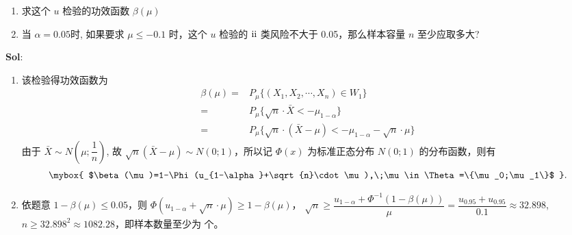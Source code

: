 \begin{enumerate}[(1)]
    \item 求这个 $u$ 检验的功效函数 $\beta(\mu)$
    \item 当 $\alpha=0.05$时, 如果要求 $\mu\leqslant-0.1$ 时，这个 $u$ 检验的 $\text{\uppercase\expandafter{\romannumeral2}}$ 类风险不大于 0.05，那么样本容量 $n$ 至少应取多大?
\end{enumerate}

\textbf{Sol}: 

\begin{enumerate}[(1)]
    \item 该检验得功效函数为
    $$
    \begin{aligned}
    \beta(\mu)=&P_{\mu}\big\{(X_1,X_2,\cdots,X_n)\in W_1\big\}\\
    =&P_{\mu}\big\{\sqrt{n}\cdot\bar{X}<-\mu_{1-\alpha}\big\}\\
    =&P_{\mu}\big\{\sqrt{n}\cdot(\bar{X}-\mu)<-\mu_{1-\alpha}-\sqrt{n}\cdot\mu\big\}
    \end{aligned}
    $$
    由于 $\bar{X}\sim N(\mu;\dfrac{1}{n})$, 故 $\sqrt{n}(\bar{X}-\mu)\sim N(0;1)$，所以记 $\Phi(x)$ 为标准正态分布 $N(0;1)$ 的分布函数，则有
    $$
    \mybox{
        $\beta(\mu)=1-\Phi(u_{1-\alpha}+\sqrt{n}\cdot \mu),\;\mu\in\Theta=\{\mu_0;\mu_1\}$
    }.
    $$
    
    \item 依题意 $1-\beta(\mu)\leqslant 0.05$，则 $\Phi(u_{1-\alpha}+\sqrt{n}\cdot \mu)\geqslant 1-\beta(\mu)$，
    $\sqrt{n}\geqslant \dfrac{u_{1-\alpha}+\Phi^{-1}(1-\beta(\mu))}{\mu}=\dfrac{u_{0.95}+u_{0.95}}{0.1}\approx32.898$,$n\geqslant32.898^2\approx 1082.28$，即样本数量至少为  个。
\end{enumerate}

\vspace{12pt}



